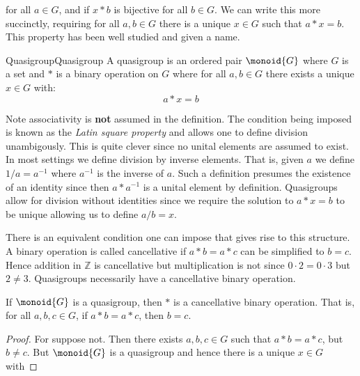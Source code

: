         for all $a\in{G}$, and if $x*b$ is bijective for all $b\in{G}$. We can
        write this more succinctly, requiring for all $a,b\in{G}$ there is a
        unique $x\in{G}$ such that $a*x=b$. This property has been well studied
        and given a name.
        \begin{fdefinition}{Quasigroup}{Quasigroup}
            A quasigroup is an \gls{ordered pair} $\monoid{G}$ where $G$ is a
            \gls{set} and $*$ is a \gls{binary operation} on $G$ where for all
            $a,b\in{G}$ there exists a unique $x\in{G}$ with:%
            \begin{equation}
                \label{eqn:Quasigroup_Equation}%
                a*x=b\tag{1}
            \end{equation}
        \end{fdefinition}
        Note associativity is \textbf{not} assumed in the definition. The
        condition being imposed is known as the \textit{Latin square property}%
         and allows one to define division
        unambigously. This is quite clever since no unital elements are assumed
        to exist. In most settings we define division by inverse elements. That
        is, given $a$ we define $1/a=a^{\minus{1}}$ where $a^{\minus{1}}$ is the
        inverse of $a$. Such a definition presumes the existence of an identity
        since then $a*a^{\minus{1}}$ is a unital element by definition.
        Quasigroups allow for division without identities since we require the
        solution to $a*x=b$ to be unique allowing us to define $a/b=x$.
        \par\hfill\par
        There is an equivalent condition one can impose that gives rise to this
        structure. A binary operation is called cancellative if $a*b=a*c$ can be
        simplified to $b=c$. Hence addition in $\mathbb{Z}$ is cancellative but
        multiplication is not since $0\cdot{2}=0\cdot{3}$ but $2\ne{3}$.
        Quasigroups necessarily have a cancellative binary operation.
        \begin{theorem}
            If $\monoid{G}$ is a quasigroup, then $*$ is a cancellative binary
            operation. That is, for all $a,b,c\in{G}$, if $a*b=a*c$, then
            $b=c$.
        \end{theorem}
        \begin{proof}
            For suppose not. Then there exists $a,b,c\in{G}$ such that
            $a*b=a*c$, but $b\ne{c}$. But $\monoid{G}$ is a quasigroup and hence
            there is a unique $x\in{G}$ with
        \end{proof}
